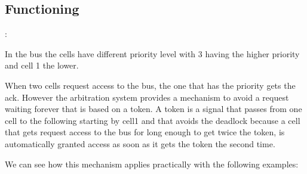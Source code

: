 \documentclass{article}
\begin{document}
\subsection{Functioning}:

In the bus the cells have different priority level with 3 having the higher 
priority and cell 1 the lower.

When two cells request access to the bus, the one that has the priority gets the
ack. However the arbitration system provides a mechanism to avoid a request waiting forever that 
is based on a token. A token is a signal that passes from one cell to the following
starting by cell1 and that avoids the deadlock because a cell that gets request
access to the bus for long enough to get twice the token, is automatically granted
access as soon as it gets the token the second time.

We can see how this mechanism applies practically with the following examples:
\end{document}
